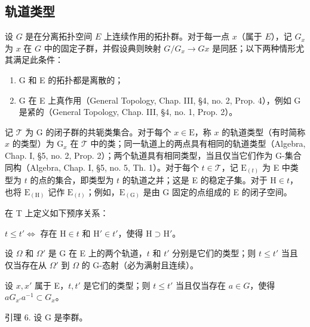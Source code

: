 \subsection{轨道类型}

设 \(G\) 是在分离拓扑空间 \(E\) 上连续作用的拓扑群。对于每一点 \(x\)（属于 \(E\)），记 \(G_x\) 为 \(x\) 在 \(G\) 中的固定子群，并假设典则映射 \(G / G_x \to Gx\) 是同胚；以下两种情形尤其满足此条件：

\begin{enumerate}
\def\labelenumi{\alph{enumi})}
\item
  G 和 E 的拓扑都是离散的；
\item
  G 在 E 上真作用（General Topology, Chap. III, §4, no. 2, Prop. 4），例如 G 是紧的（General Topology, Chap. III, §4, no. 1, Prop. 2）。
\end{enumerate}

记 \(\mathcal{T}\) 为 G 的闭子群的共轭类集合。对于每个 \(x\in \mathrm{E}\)，称 \(x\) 的轨道类型（有时简称 \(x\) 的类型）为 \(\mathrm{G}_x\) 在 \(\mathcal{T}\) 中的类；同一轨道上的两点具有相同的轨道类型（Algebra, Chap. I, §5, no. 2, Prop. 2）；两个轨道具有相同类型，当且仅当它们作为 G-集合同构（Algebra, Chap. I, §5, no. 5, Th. 1）。对于每个 \(t\in \mathcal{T}\)，记 \(\mathrm{E}_{(t)}\) 为 E 中类型为 \(t\) 的点的集合，即类型为 \(t\) 的轨道之并；这是 E 的稳定子集。对于 \(\mathrm{H}\in t\)，也将 \(\mathrm{E}_{(\mathrm{H})}\) 记作 \(\mathrm{E}_{(t)}\)；例如，\(\mathrm{E}_{(\mathrm{G})}\) 是由 G 固定的点组成的 E 的闭子空间。

在 T 上定义如下预序关系：

\(t \leq t'\Longleftrightarrow\) 存在 \(\mathrm{H} \in t\) 和 \(\mathrm{H}' \in t'\)，使得 \(\mathrm{H} \supset \mathrm{H}'\)。

设 \(\Omega\) 和 \(\Omega'\) 是 G 在 E 上的两个轨道，\(t\) 和 \(t'\) 分别是它们的类型；则 \(t \leq t'\) 当且仅当存在从 \(\Omega'\) 到 \(\Omega\) 的 G-态射（必为满射且连续）。

设 \(x, x'\) 属于 E，\(t, t'\) 是它们的类型；则 \(t \leq t'\) 当且仅当存在 \(a \in G\)，使得 \(aG_{x'}a^{-1} \subset G_x\)。

引理 6. 设 G 是李群。

